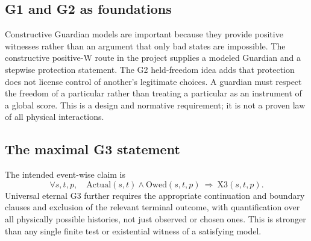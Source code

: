 \documentclass[11pt,a4paper]{article}
\newcommand{\Xthree}{\mathrm{X3}}\newcommand{\Owed}{\mathrm{Owed}}\newcommand{\Act}{\mathrm{Actual}}\newcommand{\Empty}{\varnothing}\newcommand{\Gthree}{\mathrm{G3}}\newcommand{\Dut}{\mathcal D}
\begin{document}
\subsection{G1 and G2 as foundations}
Constructive Guardian models are important because they provide positive witnesses rather than an argument that only bad states are impossible. The constructive positive-W route in the project supplies a modeled Guardian and a stepwise protection statement. The G2 held-freedom idea adds that protection does not license control of another's legitimate choices. A guardian must respect the freedom of a particular rather than treating a particular as an instrument of a global score. This is a design and normative requirement; it is not a proven law of all physical interactions.
\subsection{The maximal G3 statement}
The intended event-wise claim is
\begin{equation}\label{eq:g3}
\boxed{\forall s,t,p,\quad \Act(s,t)\land\Owed(s,t,p)\ \Longrightarrow\ \Xthree(s,t,p).}
\end{equation}
Universal eternal G3 further requires the appropriate continuation and boundary clauses and exclusion of the relevant terminal outcome, with quantification over all physically possible histories, not just observed or chosen ones. This is stronger than any single finite test or existential witness of a satisfying model.
\end{document}
